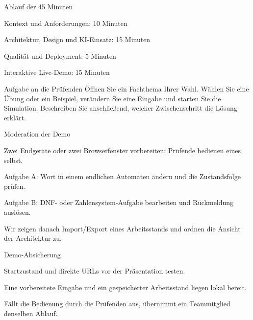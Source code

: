 
\begin{itemframe}{Ablauf der 45 Minuten}
  \item Kontext und Anforderungen: 10 Minuten
  \item Architektur, Design und KI-Einsatz: 15 Minuten
  \item Qualität und Deployment: 5 Minuten
  \item Interaktive Live-Demo: 15 Minuten
\end{itemframe}

\begin{exercise}{Aufgabe an die Prüfenden}
  Öffnen Sie ein Fachthema Ihrer Wahl. Wählen Sie eine Übung oder ein Beispiel,
  verändern Sie eine Eingabe und starten Sie die Simulation. Beschreiben Sie
  anschließend, welcher Zwischenschritt die Lösung erklärt.
\end{exercise}

\begin{itemframe}{Moderation der Demo}
  \item Zwei Endgeräte oder zwei Browserfenster vorbereiten: Prüfende bedienen eines selbst.
  \item Aufgabe A: Wort in einem endlichen Automaten ändern und die Zustandsfolge prüfen.
  \item Aufgabe B: DNF- oder Zahlensystem-Aufgabe bearbeiten und Rückmeldung auslösen.
  \item Wir zeigen danach Import/Export eines Arbeitsstands und ordnen die Ansicht der Architektur zu.
\end{itemframe}

\begin{itemframe}{Demo-Absicherung}
  \item Startzustand und direkte URLs vor der Präsentation testen.
  \item Eine vorbereitete Eingabe und ein gespeicherter Arbeitsstand liegen lokal bereit.
  \item Fällt die Bedienung durch die Prüfenden aus, übernimmt ein Teammitglied denselben Ablauf.
\end{itemframe}
